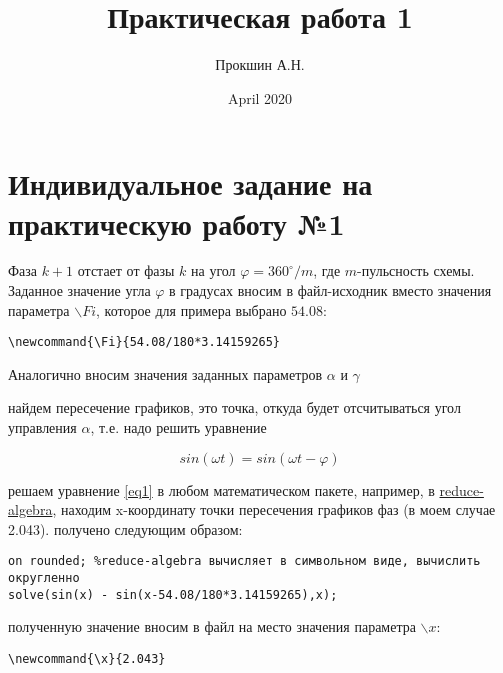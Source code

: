 \documentclass{article}
\title{Практическая работа 1} %
\author{Прокшин А.Н.}
\date{April 2020}
\begin{document}
\maketitle

\section{Индивидуальное задание на практическую работу №1}

\newcommand{\PI}{3.14159265}
\newcommand{\Fi}{54.08/180*3.14159265} %

Фаза $k+1$ отстает от фазы $k$ на угол $\varphi=360^\circ/m$, где $m$-пульсность схемы. Заданное значение угла $\varphi$ в градусах вносим в файл-исходник 
вместо значения параметра $\backslash Fi$, которое для примера выбрано  $54.08$:

\begin{verbatim}
\newcommand{\Fi}{54.08/180*3.14159265}
\end{verbatim}

Аналогично вносим значения заданных параметров $\alpha$ и $\gamma$ 
\newcommand{\alfa}{0.524}  %
\newcommand{\gammaa}{0.698} %


найдем пересечение графиков, это точка, откуда будет отсчитываться угол управления $\alpha$, т.е. надо решить уравнение

\begin{equation} %
sin(\omega t) = sin(\omega t - \varphi)
	\label{eq1}
\end{equation}   %



решаем уравнение \ref{eq1} в любом математическом пакете, например, в \href{http://www.reduce-algebra.com/obtaining.php}{reduce-algebra}, 
находим  x-координату точки пересечения графиков фаз (в моем случае 2.043). получено следующим образом:
\begin{verbatim}
on rounded; %reduce-algebra вычисляет в символьном виде, вычислить округленно
solve(sin(x) - sin(x-54.08/180*3.14159265),x);
\end{verbatim}

полученную значение вносим в файл на место значения параметра $\backslash x$:
\newcommand{\x}{2.043}

\begin{verbatim}
\newcommand{\x}{2.043}
\end{verbatim}
\end{document}
